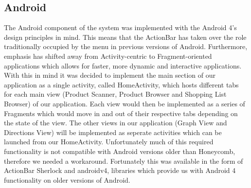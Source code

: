\subsection{Android}
The Android component of the system was implemented with the Android 4's design principles in mind. 
This means that the ActionBar has taken over the role traditionally occupied by the menu in previous versions of Android. 
Furthermore, emphasis has shifted away from Activity-centric to Fragment-oriented applications which allows for faster,
 more dynamic and interactive applications. With this in mind it was decided to
 implement the main section of our application as a single activity, called
 HomeActivity, which hosts different tabs for each main view (Product Scanner,
 Product Browser and Shopping List Browser) of our application.
 Each view would then be implemented as a series of Fragments which would move in and out of
 their respective tabs depending on the state of the view. The other views in
 our application (Graph View and Directions View) will be implemented as
 seperate activities which can be launched from our HomeActivity. Unfortunately
 much of this required functionality is not compatible with Android versions
 older than Honeycomb, therefore we needed a workaround. Fortunately this was
 available in the form of ActionBar Sherlock and androidv4, libraries which
 provide us with Android 4 functionality on older versions of Android.  






